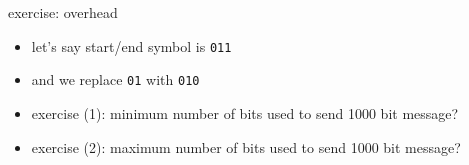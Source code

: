 \begin{frame}{exercise: overhead}
\begin{itemize}
\item let's say start/end symbol is \texttt{011}
\item and we replace \texttt{01} with \texttt{010}
\vspace{.5cm}
\item exercise (1): minimum number of bits used to send 1000 bit message?
\item exercise (2): maximum number of bits used to send 1000 bit message?
\end{itemize}
\end{frame}
